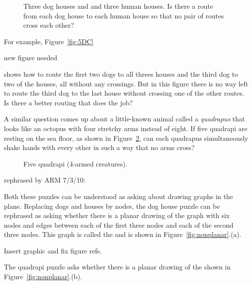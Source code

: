 \begin{figure}



\caption{Three dog houses and and three human houses.  Is there a
  route from each dog house to each human house so that no pair of
  routes cross each other?}
\label{fig:5DP}
\end{figure}

For example, Figure~\ref{fig:5DC} \begin{editingnotes}
new figure needed
\end{editingnotes} shows how to route the first two dogs to all threes
houses and the third dog to two of the houses, all without any crossings.
But in this figure there is no way left to route the third dog to the last
house without crossing one of the other routes.  Is there a better routing
that does the job?

A similar question comes up about a little-known animal called a
\emph{quadrapus} that looks like an octopus with four stretchy arms
instead of eight.  If five quadrapi are resting on the sea floor, as shown
in Figure~\ref{fig:5DA}, can each quadrapus simultaneously shake hands
with every other in such a way that no arms cross?

\begin{figure}


\caption{Five quadrapi (4-armed creatures).}

\label{fig:5DA}

\end{figure}

\begin{staffnotes}
rephrased by ARM 7/3/10:
\end{staffnotes}

Both these puzzles can be understood as asking about drawing graphs in the
plane.  Replacing dogs and houses by nodes, the dog house puzzle can be
rephrased as asking whether there is a planar drawing of the graph with
six nodes and edges between each of the first three nodes and each of the
second three nodes.  This graph is called the  and is shown in Figure~\ref{fig:nonplanar}.(a).
\begin{editingnotes}
Insert graphic and fix figure refs.
\end{editingnotes}
The quadrapi puzzle asks whether there is a planar drawing of the
  shown in
Figure~\ref{fig:nonplanar}.(b).


